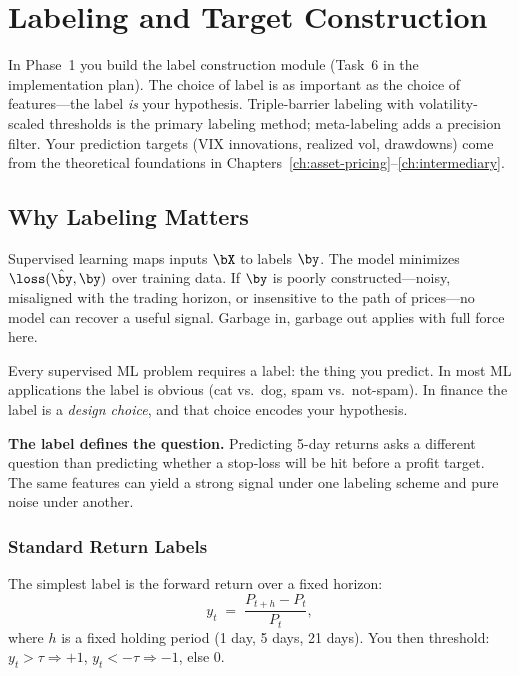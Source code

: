 \chapter{Labeling and Target Construction}
\label{ch:labeling}

\begin{projectconnection}
In Phase~1 you build the label construction module (Task~6 in the implementation plan).
The choice of label is as important as the choice of features---the label \emph{is} your hypothesis.
Triple-barrier labeling with volatility-scaled thresholds is the primary labeling method;
meta-labeling adds a precision filter.
Your prediction targets (VIX innovations, realized vol, drawdowns) come from the
theoretical foundations in Chapters~\ref{ch:asset-pricing}--\ref{ch:intermediary}.
\end{projectconnection}

\section{Why Labeling Matters}
\label{sec:labeling-why}

\begin{prereq}
Supervised learning maps inputs $\bX$ to labels $\by$.
The model minimizes $\loss(\hat{\by}, \by)$ over training data.
If $\by$ is poorly constructed---noisy, misaligned with the trading horizon, or
insensitive to the path of prices---no model can recover a useful signal.
Garbage in, garbage out applies with full force here.
\end{prereq}

Every supervised ML problem requires a label: the thing you predict.
In most ML applications the label is obvious (cat vs.\ dog, spam vs.\ not-spam).
In finance the label is a \emph{design choice}, and that choice encodes your hypothesis.

\textbf{The label defines the question.}
Predicting 5-day returns asks a different question than predicting whether
a stop-loss will be hit before a profit target.
The same features can yield a strong signal under one labeling scheme and
pure noise under another.

\subsection{Standard Return Labels}

The simplest label is the forward return over a fixed horizon:
\begin{equation}
\label{eq:fixed-horizon-label}
y_t \;=\; \frac{P_{t+h} - P_t}{P_t},
\end{equation}
where $h$ is a fixed holding period (1 day, 5 days, 21 days).
You then threshold: $y_t > \tau \Rightarrow +1$, $y_t < -\tau \Rightarrow -1$, else $0$.

